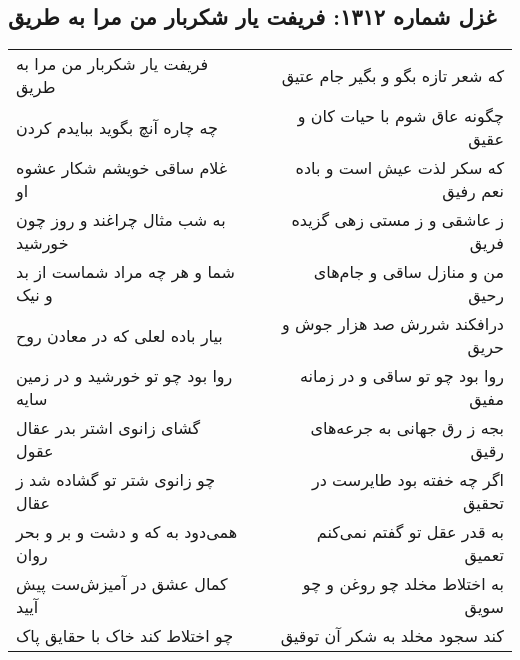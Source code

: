 \begin{center}
\section*{غزل شماره ۱۳۱۲: فریفت یار شکربار من مرا به طریق}
\label{sec:1312}
\begin{longtable}{l p{0.5cm} r}
فریفت یار شکربار من مرا به طریق
&&
که شعر تازه بگو و بگیر جام عتیق
\\
چه چاره آنچ بگوید ببایدم کردن
&&
چگونه عاق شوم با حیات کان و عقیق
\\
غلام ساقی خویشم شکار عشوه او
&&
که سکر لذت عیش است و باده نعم رفیق
\\
به شب مثال چراغند و روز چون خورشید
&&
ز عاشقی و ز مستی زهی گزیده فریق
\\
شما و هر چه مراد شماست از بد و نیک
&&
من و منازل ساقی و جام‌های رحیق
\\
بیار باده لعلی که در معادن روح
&&
درافکند شررش صد هزار جوش و حریق
\\
روا بود چو تو خورشید و در زمین سایه
&&
روا بود چو تو ساقی و در زمانه مفیق
\\
گشای زانوی اشتر بدر عقال عقول
&&
بجه ز رق جهانی به جرعه‌های رقیق
\\
چو زانوی شتر تو گشاده شد ز عقال
&&
اگر چه خفته بود طایرست در تحقیق
\\
همی‌دود به که و دشت و بر و بحر روان
&&
به قدر عقل تو گفتم نمی‌کنم تعمیق
\\
کمال عشق در آمیزش‌ست پیش آیید
&&
به اختلاط مخلد چو روغن و چو سویق
\\
چو اختلاط کند خاک با حقایق پاک
&&
کند سجود مخلد به شکر آن توقیق
\\
\end{longtable}
\end{center}

